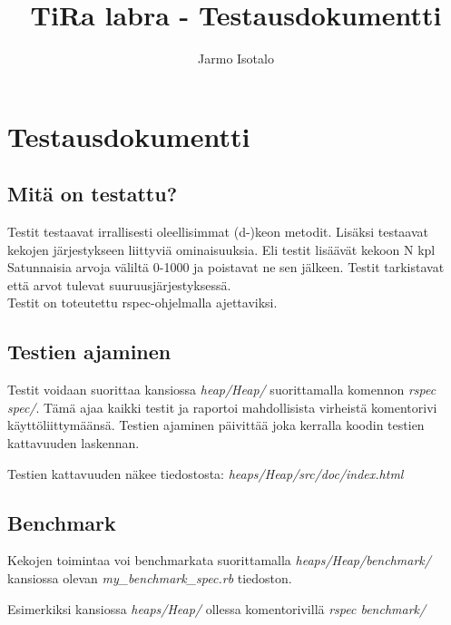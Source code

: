 \documentclass[a4paper,12pt]{article}
\begin{document}
\title{TiRa labra - Testausdokumentti} 
\author{Jarmo Isotalo}
\maketitle

\section{Testausdokumentti}

\subsection{Mitä on testattu?}
Testit testaavat irrallisesti oleellisimmat (d-)keon metodit. Lisäksi testaavat kekojen järjestykseen liittyviä ominaisuuksia. Eli testit lisäävät kekoon N kpl Satunnaisia arvoja väliltä 0-1000 ja poistavat ne sen jälkeen. Testit tarkistavat että arvot tulevat suuruusjärjestyksessä.\\

Testit on toteutettu rspec-ohjelmalla ajettaviksi.

\subsection{Testien ajaminen}
Testit voidaan suorittaa kansiossa  \emph{heap/Heap/} suorittamalla komennon \emph{rspec spec/}. Tämä ajaa kaikki testit ja raportoi mahdollisista virheistä komentorivi käyttöliittymäänsä.
Testien ajaminen päivittää joka kerralla koodin testien kattavuuden laskennan. 

Testien kattavuuden näkee tiedostosta: 
\emph{heaps/Heap/src/doc/index.html} 


\subsection{Benchmark}
Kekojen toimintaa voi benchmarkata suorittamalla \emph{heaps/Heap/benchmark/} kansiossa olevan \emph{my\_benchmark\_spec.rb}  tiedoston.

Esimerkiksi kansiossa \emph{heaps/Heap/} ollessa komentorivillä \emph{rspec benchmark/}
\end{document}
